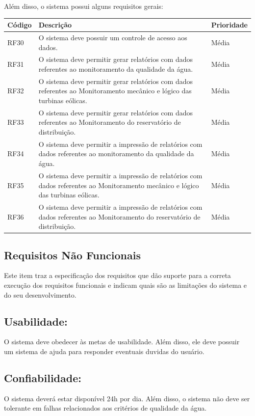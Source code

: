   Além disso, o sistema possui alguns requisitos gerais:
  
    \begin{longtable}{|m{3.0cm}|m{7.5cm}|m{3.5cm}|}
      \hline
\textbf{Código} & \textbf{Descrição} & \textbf{Prioridade}\\
\hline
RF30 & O sistema deve possuir um controle de acesso aos dados. & Média\\
\hline
RF31 & O sistema deve permitir gerar relatórios com dados referentes ao monitoramento da qualidade da água. & Média\\
\hline
RF32 & O sistema deve permitir gerar relatórios com dados referentes ao Monitoramento mecânico e lógico das turbinas eólicas. & Média\\
\hline
RF33 & O sistema deve permitir gerar relatórios com dados referentes ao Monitoramento do reservatório de distribuição. & Média\\
\hline
RF34 & O sistema deve permitir a impressão de relatórios com dados referentes ao monitoramento da qualidade da água. & Média\\
\hline
RF35 & O sistema deve permitir a impressão de relatórios com dados referentes ao Monitoramento mecânico e lógico das turbinas eólicas. & Média\\
\hline
RF36 & O  sistema deve permitir a impressão de relatórios com dados referentes ao Monitoramento do reservatório de distribuição. & Média\\
\hline

  \end{longtable}
  
  \subsection*{Requisitos Não Funcionais}
  Este item traz a especificação dos requisitos que dão suporte para a correta execução dos requisitos funcionais e indicam quais são as limitações 
  do sistema e do seu desenvolvimento.
  
  \subsection*{Usabilidade:}
  O sistema deve obedecer às metas de usabilidade. Além disso, ele deve possuir um sistema de ajuda para responder eventuais duvidas do usuário.
  
  \subsection*{Confiabilidade:}
  O sistema deverá estar disponível 24h por dia. Além disso, o sistema não deve ser tolerante em falhas relacionados aos critérios de qualidade da água.

